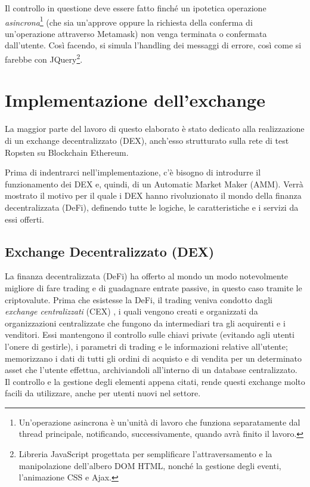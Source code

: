 Il controllo in questione deve essere fatto finché un ipotetica operazione \textit{asincrona}\footnote{Un'operazione asincrona è un'unità di lavoro che funziona separatamente dal thread principale, notificando, successivamente, quando avrà finito il lavoro.} (che sia un'approve oppure la richiesta della conferma di un'operazione attraverso Metamask) non venga terminata o confermata dall'utente. Così facendo, si simula l'handling dei messaggi di errore, così come si farebbe con JQuery\footnote{Libreria JavaScript progettata per semplificare l'attraversamento e la manipolazione dell'albero DOM HTML, nonché la gestione degli eventi, l'animazione CSS e Ajax.}. 

\section{Implementazione dell'exchange}\label{exchange}
La maggior parte del lavoro di questo elaborato è stato dedicato alla realizzazione di un exchange decentralizzato (DEX), anch'esso strutturato sulla rete di test Ropsten su Blockchain Ethereum.

Prima di indentrarci nell'implementazione, c'è bisogno di introdurre il funzionamento dei DEX e, quindi, di un Automatic Market Maker (AMM).
Verrà mostrato il motivo per il quale i DEX hanno rivoluzionato il mondo della finanza decentralizzata (DeFi), definendo tutte le logiche, le caratteristiche e i servizi da essi offerti.

\subsection{Exchange Decentralizzato (DEX)}\label{dex}
La finanza decentralizzata (DeFi) ha offerto al mondo un modo notevolmente migliore di fare trading e di guadagnare entrate passive, in questo caso tramite le criptovalute. Prima che esistesse la DeFi, il trading veniva condotto dagli \textit{exchange centralizzati} (CEX) , i quali vengono creati e organizzati da organizzazioni centralizzate che fungono da intermediari tra gli acquirenti e i venditori. Essi mantengono il controllo sulle chiavi private (evitando agli utenti l'onere di gestirle), i parametri di trading e le informazioni relative all'utente; memorizzano i dati di tutti gli ordini di acquisto e di vendita per un determinato asset che l'utente effettua, archiviandoli all'interno di un database centralizzato.
Il controllo e la gestione degli elementi appena citati, rende questi exchange molto facili da utilizzare, anche per utenti nuovi nel settore.

